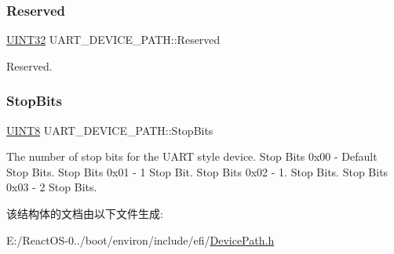 \subsubsection{\texorpdfstring{Reserved}{Reserved}}
{\footnotesize\ttfamily \hyperlink{_processor_bind_8h_ae1e6edbbc26d6fbc71a90190d0266018}{U\+I\+N\+T32} U\+A\+R\+T\+\_\+\+D\+E\+V\+I\+C\+E\+\_\+\+P\+A\+T\+H\+::\+Reserved}

Reserved. \mbox{\label{struct_u_a_r_t___d_e_v_i_c_e___p_a_t_h_a29936123a70606870cf91df5866c40dd}} 
\subsubsection{\texorpdfstring{Stop\+Bits}{StopBits}}
{\footnotesize\ttfamily \hyperlink{_processor_bind_8h_ab27e9918b538ce9d8ca692479b375b6a}{U\+I\+N\+T8} U\+A\+R\+T\+\_\+\+D\+E\+V\+I\+C\+E\+\_\+\+P\+A\+T\+H\+::\+Stop\+Bits}

The number of stop bits for the U\+A\+RT style device. Stop Bits 0x00 -\/ Default Stop Bits. Stop Bits 0x01 -\/ 1 Stop Bit. Stop Bits 0x02 -\/ 1. Stop Bits. Stop Bits 0x03 -\/ 2 Stop Bits. 

该结构体的文档由以下文件生成\+:\begin{DoxyCompactItemize}
\item 
E\+:/\+React\+O\+S-\/0../boot/environ/include/efi/\hyperlink{_device_path_8h}{Device\+Path.\+h}\end{DoxyCompactItemize}
